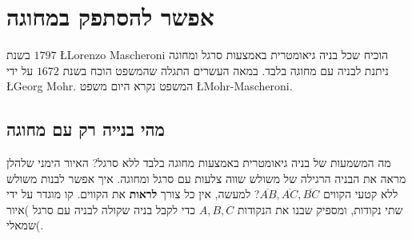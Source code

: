 


\chapter{אפשר להסתפק במחוגה}\label{c.compass}


בשנת
$1797$
\L{Lorenzo Mascheroni}
הוכיח שכל בניה גיאומטרית באמצעות סרגל ומחוגה ניתנת לבניה עם מחוגה בלבד. במאה העשרים התגלה שהמשפט הוכח בשנת
$1672$
על ידי
\L{Georg Mohr}.
המשפט נקרא היום משפט
\L{Mohr-Mascheroni}.


\section{מהי בנייה רק עם מחוגה}

מה המשמעות של בניה גיאומטרית באמצעות  מחוגה בלבד ללא סרגל? האיור הימני שלהלן מראה את הבניה הרגילה של משולש שווה צלעות עם סרגל ומחוגה. איך אפשר לבנות משולש ללא קטעי הקווים
$\overline{AB},\overline{AC},\overline{BC}$?
למעשה, אין כל צורך
\textbf{לראות}
את הקווים. קו מוגדר על ידי שתי נקודות, ומספיק שבנו את הנקודות 
$A,B,C$
 כדי לקבל בניה שקולה לבניה עם סרגל )איור שמאלי(.

